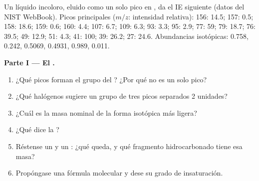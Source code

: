 \begin{problem}
\label{pb:b2:mass-spec-atomic:1}
Un líquido incoloro, eluido como un solo pico en , da el  IE siguiente (datos del NIST
WebBook). Picos principales ($m/z$: intensidad relativa): 156: 14.5; 157: 0.5; 158: 18.6; 159: 0.6; 160:
4.4; 107: 6.7; 109: 6.3; 93: 3.3; 95: 2.9; 77: 59; 79: 18.7; 76: 39.5; 49: 12.9; 51: 4.3; 41: 100; 39:
26.2; 27: 24.6. Abundancias isotópicas:  0.758,  0.242,  0.5069,
 0.4931,  0.989,  0.011.

\begin{center}
\end{center}

\medskip
\noindent\textbf{Parte I --- El .}
\begin{enumerate}
  \item ¿Qué picos forman el grupo del ? ¿Por qué no es un solo pico?
  \item ¿Qué halógenos sugiere un grupo de tres picos separados 2 unidades?
  \item ¿Cuál es la masa nominal de la forma isotópica más ligera?
  \item ¿Qué dice la ?
  \item Réstense un  y un : ¿qué queda, y qué fragmento hidrocarbonado
        tiene esa masa?
  \item Propóngase una fórmula molecular y dese su grado de insaturación.
\end{enumerate}


\end{problem}

